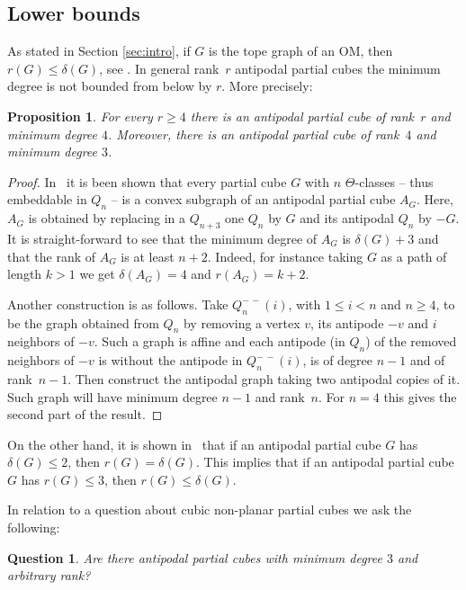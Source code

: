\documentclass[final,11pt]{article}
\newtheorem{prop}[thm]{Proposition}%
\newtheorem{quest}{Question}
\begin{document}
\subsection{Lower bounds}

As stated in Section \ref{sec:intro}, if $G$ is the tope graph of an OM, then $r(G)\leq\delta(G)$, see \cite[Exercise 4.4]{bjvestwhzi-93}.
In general rank~$r$ antipodal partial cubes the minimum degree is not bounded from below by $r$. More precisely:
\begin{prop}\label{prop:nolowerbound}
 For every $r\geq 4$ there is an antipodal partial cube of rank~$r$ and minimum degree $4$. Moreover,  there is an antipodal partial cube of rank~$4$ and minimum degree $3$.
\end{prop}
\begin{proof}
 In~\cite{Kna-17} it is been shown that every partial cube $G$ with $n$ $\Theta$-classes -- thus embeddable in $Q_n$ -- is a convex subgraph of an antipodal partial cube $A_G$. Here, $A_G$ is obtained by replacing in a $Q_{n+3}$ one $Q_n$ by $G$ and its antipodal $Q_n$ by $-G$. It is straight-forward to see that the minimum degree of $A_G$ is $\delta(G)+3$ and that the rank of $A_G$ is at least $n+2$. Indeed, for instance taking $G$ as a path of length $k>1$ we get $\delta(A_G)=4$ and $r(A_G)=k+2$.
 
 Another construction is as follows. Take $Q_n^{-\, -}(i)$, with $1\leq i<n$ and $n\geq 4$, to be the graph obtained from $Q_n$ by removing a vertex $v$, its antipode $-v$ and $i$ neighbors of $-v$. Such a graph is affine and each antipode (in $Q_n$) of the removed neighbors of $-v$ is without the antipode in $Q_n^{-\, -}(i)$, is of degree $n-1$ and of rank~$n-1$. Then construct the antipodal graph taking two antipodal copies of it. Such graph will have minimum degree $n-1$ and rank~$n$. For $n=4$ this gives the second part of the result.
\end{proof}

On the other hand, it is shown in~\cite{polat2018some} that if an antipodal partial cube $G$ has $\delta(G)\leq 2$, then $r(G)=\delta(G)$. This implies that if an antipodal partial cube $G$ has $r(G)\leq 3$, then $r(G)\leq\delta(G)$.

In relation to a question about cubic non-planar partial cubes we ask the following:
\begin{quest}
Are there antipodal partial cubes with minimum degree $3$ and arbitrary rank? 
\end{quest}
\end{document}
